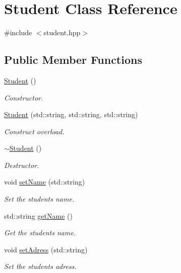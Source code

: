 \hypertarget{classStudent}{}\section{Student Class Reference}
\label{classStudent}


{\ttfamily \#include $<$student.\+hpp$>$}

\subsection*{Public Member Functions}
\begin{DoxyCompactItemize}
\item 
\hyperlink{classStudent_af9168cedbfa5565cf0b20c1a9d3f5c9d}{Student} ()
\begin{DoxyCompactList}\small\item\em Constructor. \end{DoxyCompactList}\item 
\hyperlink{classStudent_a369e05da376d35e9fc821f3c09c01c05}{Student} (std\+::string, std\+::string, std\+::string)
\begin{DoxyCompactList}\small\item\em Construct overload. \end{DoxyCompactList}\item 
\hyperlink{classStudent_a54a8ea060d6cd04222c3a2f89829f105}{$\sim$\+Student} ()
\begin{DoxyCompactList}\small\item\em Destructor. \end{DoxyCompactList}\item 
void \hyperlink{classStudent_a978f009a5d80c19999f7770cd62f4088}{set\+Name} (std\+::string)
\begin{DoxyCompactList}\small\item\em Set the student\textquotesingle{}s name. \end{DoxyCompactList}\item 
std\+::string \hyperlink{classStudent_a729c900a0e95c46f90668f527a72ad34}{get\+Name} ()
\begin{DoxyCompactList}\small\item\em Get the student\textquotesingle{}s name. \end{DoxyCompactList}\item 
void \hyperlink{classStudent_a69ded62af3d483e4c9bf8505a58cefe5}{set\+Adress} (std\+::string)
\begin{DoxyCompactList}\small\item\em Set the student\textquotesingle{}s adress. \end{DoxyCompactList}\item 

\end{DoxyCompactItemize}

